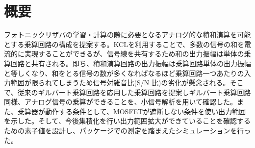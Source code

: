 \chapter*{概要}
フォトニックリザバの学習・計算の際に必要となるアナログ的な積和演算を可能とする乗算回路の構成を提案する。KCLを利用することで、多数の信号の和を電流的に実現することができるが、信号線を共有するため和の出力振幅は単体の乗算回路と共有される。即ち、積和演算回路の出力振幅は乗算回路単体の出力振幅と等しくなり、和をとる信号の数が多くなればなるほど乗算回路一つあたりの入力範囲が限られてしまうため信号対雑音比(S/N 比)の劣化が懸念される。そこで、従来のギルバート乗算回路を応用した乗算回路を提案しギルバート乗算回路同様、アナログ信号の乗算ができることを、小信号解析を用いて確認した。また、乗算器が動作する条件として、MOSFETが遮断しない条件を使い出力範囲を示した。そして、今後集積化を行い出力範囲拡大ができていることを確認するための素子値を設計し、パッケージでの測定を踏まえたシミュレーションを行った。

